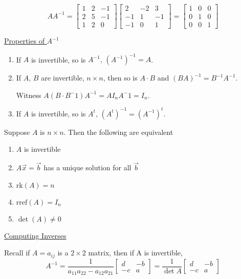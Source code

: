\documentclass[../main.tex]{subfiles}
\begin{document}
\begin{example}[]
    \[ AA^{-1} =
        \begin{bmatrix}
            1 & 2 & -1 \\
            2 & 5 & -1 \\
            1 & 2 & 0
        \end{bmatrix}
        \begin{bmatrix}
            2 & -2 & 3 \\
            -1 & 1 & -1 \\
            -1 & 0 & 1
        \end{bmatrix}
        = \begin{bmatrix}
            1 & 0 & 0 \\
            0 & 1 & 0 \\
            0 & 0 & 1
        \end{bmatrix}
    \]
\end{example}

\underline{Properties of \( A^{-1} \)}
\begin{enumerate}
    \item If \( A \) is invertible, so is \( A^{-1}, \, \left( A^{-1} \right)^{-1} = A \).
    \item If \( A, \, B \) are invertible, \( n \times n \), then so is \( A \cdot B \) and \( (BA)^{-1} = B^{-1}A^{-1} \).

        Witness \( A \left( B \cdot B^-1 \right)A^{-1} = A I_n A^-1 = I_n \).
    \item If \( A \) is invertible, so is \( A^t, \, \left( A^t \right)^{-1} = \left( A^{-1} \right)^t \).
\end{enumerate}

\begin{theorem}[]
    Suppose \( A \) is \( n \times n \).
    Then the following are equivalent
    \begin{enumerate}
        \item \( A \) is invertible
        \item \( A \vec{x} = \vec{b} \) has a unique solution for all \( \vec{b} \)
        \item \( \text{rk}(A) = n \)
        \item \( \text{rref}(A) = I_n \)
        \item \( \det(A) \neq 0 \)
    \end{enumerate}
\end{theorem}

\underline{Computing Inverses}

Recall if \( A = a_{ij} \) is a \( 2 \times 2 \) matrix, then
if A is invertible,
\[ A^{-1} = \frac{1}{a_{11}a_{22}-a_{12}a_{21}} \begin{bmatrix}
    d & -b \\
    -c & a
\end{bmatrix} = \frac{1}{\det A} \begin{bmatrix}
    d & -b \\
    -c & a
\end{bmatrix} \]
\end{document}
